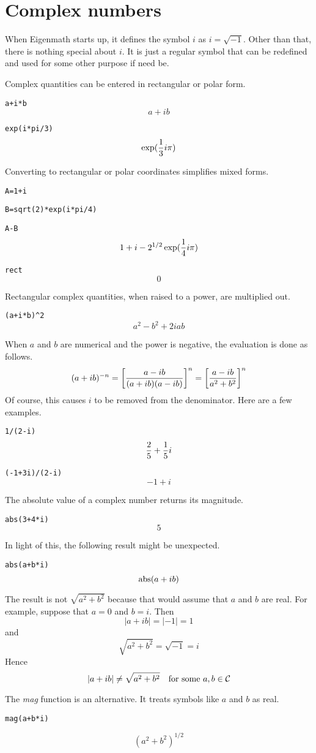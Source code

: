 \section{Complex numbers}
When Eigenmath starts up, it defines the symbol $i$ as $i=\sqrt{-1}$.
Other than that, there is nothing special about $i$.
It is just a regular symbol that can be redefined and used for some other purpose if need be.

\medskip
\noindent
Complex quantities can be entered in rectangular or polar form.

\medskip
\verb$a+i*b$
$$a+ib$$

\verb$exp(i*pi/3)$
$$\exp({1\over3}i\pi)$$

\medskip
\noindent
Converting to rectangular or polar coordinates simplifies mixed forms.

\medskip
\verb$A=1+i$

\verb$B=sqrt(2)*exp(i*pi/4)$

\verb$A-B$
$$1+i-2^{1/2}\exp({1\over4}i\pi)$$

\verb$rect$
$$0$$

\medskip
\noindent
Rectangular complex quantities, when raised to a power, are multiplied out.

\medskip
\verb$(a+i*b)^2$
$$a^2-b^2+2iab$$

\medskip
\noindent
When $a$ and $b$ are numerical and the power is negative, the evaluation is done as follows.
$$(a+ib)^{-n}=\left[{a-ib\over(a+ib)(a-ib)}\right]^n=\left[{a-ib\over a^2+b^2}\right]^n$$
Of course, this causes $i$ to be removed from the denominator.
Here are a few examples.

\medskip
\verb$1/(2-i)$
$${2\over5}+{1\over5}i$$

\verb$(-1+3i)/(2-i)$
$$-1+i$$

\newpage

\noindent
The absolute value of a complex number returns its magnitude.

\medskip
\verb$abs(3+4*i)$
$$5$$

\medskip
\noindent
In light of this, the following result might be unexpected.

\medskip
\verb$abs(a+b*i)$
$$\mathop{\rm abs}(a+ib)$$

\medskip
\noindent
The result is not $\sqrt{a^2+b^2}$ because that would assume that
$a$ and $b$ are real.
For example, suppose that $a=0$ and $b=i$.
Then
$$|a+ib|=|-1|=1$$
and
$$\sqrt{a^2+b^2}=\sqrt{-1}=i$$
Hence
$$|a+ib|\ne\sqrt{a^2+b^2}\quad\hbox{for some $a,b\in\cal C$}$$

\medskip
\noindent
The {\it mag} function is an alternative.
It treats symbols like $a$ and $b$ as real.

\medskip
\verb$mag(a+b*i)$

$$(a^2+b^2)^{1/2}$$


